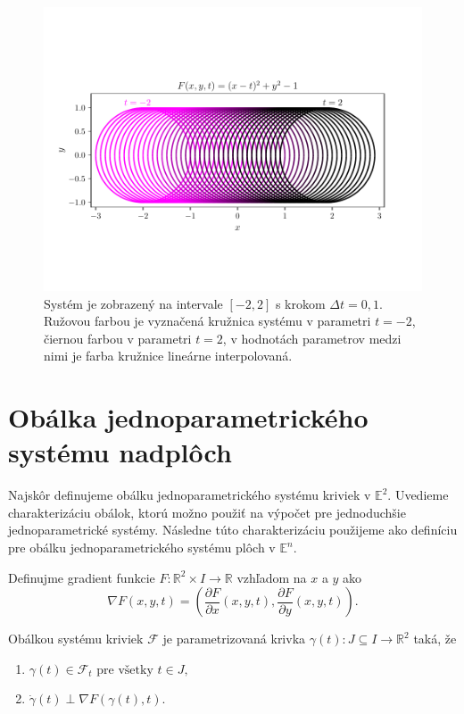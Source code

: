\begin{figure}[h]
	\centering
	\includegraphics[trim={0.5cm 2.5cm 0.5cm 3cm},clip]{images/elements.pdf}
	\caption[Zobrazenie prvkov systému.]{Systém je zobrazený na intervale $[-2,2]$ s krokom  $\Delta t = 0,1$. Ružovou farbou je vyznačená kružnica systému v parametri $t=-2$, čiernou farbou v parametri $t = 2$, v hodnotách parametrov medzi nimi je farba kružnice lineárne interpolovaná. }
	\label{fig:one_element_of_system}
\end{figure}

\section{Obálka jednoparametrického systému nadplôch}
Najskôr definujeme obálku jednoparametrického systému kriviek v $\mathbb{E}^2$. Uvedieme charakterizáciu obálok, ktorú možno použiť na výpočet pre jednoduchšie jednoparametrické systémy. Následne túto charakterizáciu použijeme ako definíciu pre obálku jednoparametrického systému plôch v $\mathbb{E}^n$.

\begin{definition}
Definujme gradient funkcie $F \colon \mathbb{R}^2 \times I \rightarrow \mathbb{R}$ vzhľadom na $x$ a $y$ ako
$$\nabla F(x, y, t) = \left(\frac{\partial F}{\partial x}(x, y, t), \frac{\partial F}{\partial y}(x, y, t) \right).$$ 
\end{definition}

\begin{definition}
\label{definicia}
Obálkou systému kriviek $ \mathcal{F} $ je parametrizovaná krivka $\gamma(t) \colon J \subseteq I \rightarrow \mathbb{R}^{2}$ taká, že 
\begin{enumerate}
\item $\gamma(t) \in \mathcal{F}_{t} \text{ pre všetky } t \in J,$
\item $\dot{\gamma}(t) \perp \nabla F \left( \gamma(t), t \right).$
\end{enumerate}
\end{definition}

